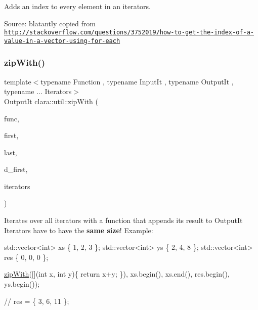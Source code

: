 Adds an index to every element in an iterators. 

Source\+: blatantly copied from \href{http://stackoverflow.com/questions/3752019/how-to-get-the-index-of-a-value-in-a-vector-using-for-each}{\tt http\+://stackoverflow.\+com/questions/3752019/how-\/to-\/get-\/the-\/index-\/of-\/a-\/value-\/in-\/a-\/vector-\/using-\/for-\/each} \mbox{\label{namespaceclara_1_1util_a0c2e7a0cd942934cacd30db84c8095cc}} 
\subsubsection{\texorpdfstring{zip\+With()}{zipWith()}}
{\footnotesize\ttfamily template$<$typename Function , typename Input\+It , typename Output\+It , typename ... Iterators$>$ \\
Output\+It clara\+::util\+::zip\+With (\begin{DoxyParamCaption}\item[{Function}]{func,  }\item[{Input\+It}]{first,  }\item[{Input\+It}]{last,  }\item[{Output\+It}]{d\+\_\+first,  }\item[{Iterators ...}]{iterators }\end{DoxyParamCaption})}



Iterates over all iterators with a function that appends its result to Output\+It Iterators have to have the {\bfseries same size}! Example\+: 


\begin{DoxyCode}
 std::vector<int> xs \{ 1, 2, 3 \};
 std::vector<int> ys \{ 2, 4, 8 \};
 std::vector<int> res \{ 0, 0, 0 \};

 \hyperlink{namespaceclara_1_1util_a0c2e7a0cd942934cacd30db84c8095cc}{zipWith}([](\textcolor{keywordtype}{int} x, \textcolor{keywordtype}{int} y)\{ \textcolor{keywordflow}{return} x+y; \}),
            xs.begin(),
            xs.end(),
            res.begin(),
            ys.begin());

\textcolor{comment}{// res = \{ 3, 6, 11 \};}
\end{DoxyCode}
 \mbox{\label{namespaceclara_1_1util_aeb41a8f553acc4a836cabbcad96e1007}} 
